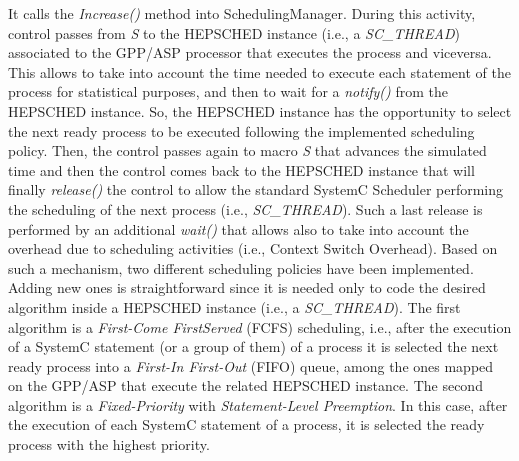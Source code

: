 It calls the \textit{Increase()} method into SchedulingManager. During this activity, control passes from \textit{S} to the HEPSCHED instance (i.e., a \textit{SC\_THREAD}) associated to the GPP/ASP processor that executes the process and viceversa. This allows to take into account the time needed to execute each statement of the process for statistical purposes, and then to wait for a \textit{notify()} from the HEPSCHED instance. So, the HEPSCHED instance has the opportunity to select the next ready process to be executed following the implemented scheduling policy. Then, the control passes again to macro \textit{S} that advances the simulated time and then the control comes back to the HEPSCHED instance that will finally \textit{release()} the control to allow the standard SystemC Scheduler performing the scheduling of the next process (i.e., \textit{SC\_THREAD}). Such a last release is performed by an additional \textit{wait()} that allows also to take into account the overhead due to scheduling activities (i.e., Context Switch Overhead). Based on such a mechanism, two different scheduling policies have been implemented. Adding new ones is straightforward since it is needed only to code the desired algorithm inside a HEPSCHED instance (i.e., a \textit{SC\_THREAD}). The first algorithm is a \textit{First-Come FirstServed} (FCFS) scheduling, i.e., after the execution of a SystemC statement (or a group of them) of a process it is selected the next ready process into a \textit{First-In First-Out} (FIFO) queue, among the ones mapped on the GPP/ASP that execute the related HEPSCHED instance. The second algorithm is a \textit{Fixed-Priority} with \textit{Statement-Level Preemption}. In this case, after the execution of each SystemC statement of a process, it is selected the ready process with the highest priority. \par
